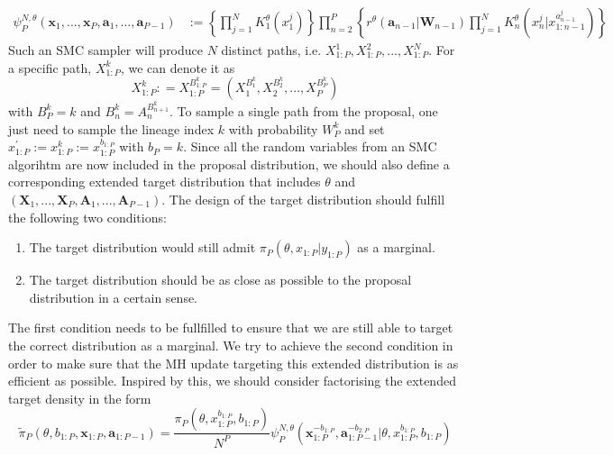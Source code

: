 \documentclass[12pt,a4paper]{article}
\begin{document}
\begin{equation}
    \label{JointDensity-of-SMC}
    \begin{split}
        \psi_P^{N,\theta}(\textbf{x}_1,...,\textbf{x}_P,\textbf{a}_1,...,\textbf{a}_{P-1}) & := \left\{\prod_{j=1}^{N}K_1^{\theta}\left(x_1^j\right)\right\}\prod_{n=2}^{P}\left\{r^{\theta}\left(\textbf{a}_{n-1}|\textbf{W}_{n-1}\right)\prod_{j=1}^{N}K_n^{\theta}\left(x_n^j|x_{1:n-1}^{a_{n-1}^j}\right)\right\}
    \end{split}
\end{equation}
Such an SMC sampler will produce $N$ distinct paths, i.e. $X_{1:P}^1, X_{1:P}^2,...,X_{1:P}^N$. For a specific path, $X_{1:P}^k$, we can denote it as 
$$X_{1:P}^k : = X_{1:P}^{B_{1:P}^k}=\left(X_1^{B_1^k},X_2^{B_2^k},...,X_P^{B_P^k}\right)$$
with $B_P^k = k$ and $B_n^k = A_{n}^{B_{n+1}^k}$. To sample a single path from the proposal, one just need to sample the lineage index $k$ with probability $W_P^k$ and set $x_{1:P}^{'}:= x_{1:P}^{k}:=x_{1:P}^{b_{1:P}}$ with $b_P = k$. Since all the random variables from an SMC algorihtm are now included in the proposal distribution, we should also define a corresponding extended target distribution that includes $\theta$ and $\left(\mathbf{X}_1,...,\mathbf{X}_P,\mathbf{A}_1,...,\mathbf{A}_{P-1}\right)$. The design of the target distribution should fulfill the following two conditions:
\begin{enumerate}[label=\textit{Condition \arabic*.},leftmargin=*]
    \item The target distribution would still admit $\pi_P(\theta,x_{1:P}|y_{1:P})$ as a marginal.
    \item The target distribution should be as close as possible to the proposal distribution in a certain sense.
\end{enumerate}
The first condition needs to be fullfilled to ensure that we are still able to target the correct distribution as a marginal. We try to achieve the second condition in order to make sure that the MH update targeting this extended distribution is as efficient as possible. Inspired by this, we should consider factorising the extended target density in the form
\begin{equation}
    \label{PMCMC-Form of extended target}
    \tilde{\pi}_P(\theta,b_{1:P},\mathbf{x}_{1:P},\mathbf{a}_{1:P-1}) = \frac{\pi_{P}(\theta,x_{1:P}^{b_{1:P}},b_{1:P})}{N^P}\psi_P^{N,\theta}(\mathbf{x}_{1:P}^{-b_{1:P}},\mathbf{a}_{1:P-1}^{-b_{2:P}}|\theta,x_{1:P}^{b_{1:P}},b_{1:P})
\end{equation}  
\end{document}
